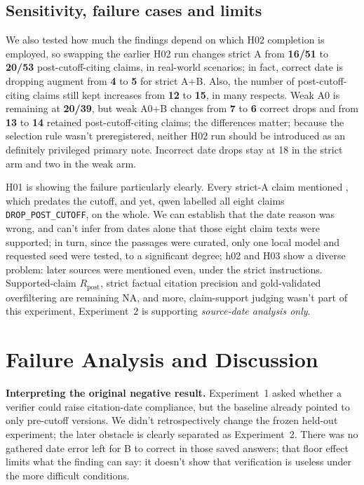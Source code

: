 \documentclass[12pt,a4paper]{article}
\newcommand{\NA}{\textsc{NA}}
\begin{document}
\subsection{Sensitivity, failure cases and limits}
We also tested how much the findings depend on which H02 completion is employed, so swapping the earlier H02 run changes strict A from \textbf{16/51} to \textbf{20/53} post-cutoff-citing claims, in real-world scenarios; in fact, correct date is dropping augment from \textbf{4} to \textbf{5} for strict A+B. Also, the number of post-cutoff-citing claims still kept increases from \textbf{12} to \textbf{15}, in many respects. Weak A0 is remaining at \textbf{20/39}, but weak A0+B changes from \textbf{7} to \textbf{6} correct drops and from \textbf{13} to \textbf{14} retained post-cutoff-citing claims; the differences matter; because the selection rule wasn't preregistered, neither H02 run should be introduced as an definitely privileged primary note. Incorrect date drops stay at 18 in the strict arm and two in the weak arm.

H01 is showing the failure particularly clearly. Every strict-A claim mentioned , which predates the cutoff, and yet, qwen labelled all eight claims \texttt{DROP\_POST\_CUTOFF}, on the whole. We can establish that the date reason was wrong, and can't infer from dates alone that those eight claim texts were supported; in turn, since the passages were curated, only one local model and requested seed were tested, to a significant degree; h02 and H03 show a diverse problem: later sources were mentioned even, under the strict instructions. Supported-claim $R_{\mathrm{post}}$, strict factual citation precision and gold-validated overfiltering are remaining \NA, and more, claim-support judging wasn't part of this experiment, Experiment~2 is supporting \emph{source-date analysis only}.

\section{Failure Analysis and Discussion}
\textbf{Interpreting the original negative result.} Experiment~1 asked whether a verifier could raise citation-date compliance, but the baseline already pointed to only pre-cutoff versions. We didn't retrospectively change the frozen held-out experiment; the later obstacle is clearly separated as Experiment~2. There was no gathered date error left for B to correct in those saved answers; that floor effect limits what the finding can say: it doesn't show that verification is useless under the more difficult conditions.
\end{document}
